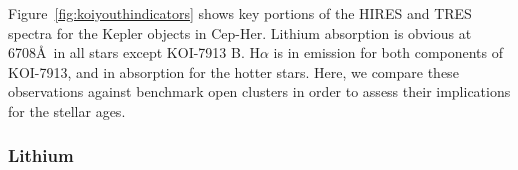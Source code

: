 \documentclass[12pt,twocolumn,tighten,linenumbers]{aastex63}
\begin{document}
Figure~\ref{fig:koiyouthindicators} shows key portions of the HIRES
and TRES spectra for the Kepler objects in Cep-Her.  Lithium
absorption is obvious at 6708\AA\ in all stars except KOI-7913 B.  
H$\alpha$ is in emission for both components of
KOI-7913, and in absorption for the hotter stars.  Here, we compare
these observations against benchmark open clusters in order to
assess their implications for the stellar ages.

\subsubsection{Lithium}

\begin{figure}[tp]
	\begin{center}
		\leavevmode
	
		\vspace{-0.35cm}
	

\end{center}
\end{figure}
\end{document}
